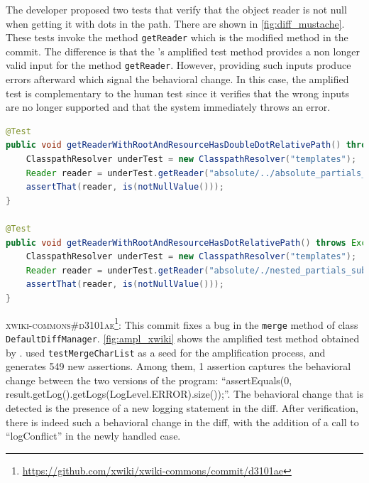 The developer proposed two tests that verify that the object reader is not null when getting it with dots in the path.
There are shown in \autoref{fig:diff_mustache}.
These tests invoke the method \texttt{getReader} which is the modified method in the commit.
%
The difference is that the \DCII's amplified test method provides a non longer valid input for the method \texttt{getReader}.
However, providing such inputs produce errors afterward which signal the behavioral change.
In this case, the amplified test is complementary to the human test since it verifies that the wrong inputs are no longer supported and that the system immediately throws an error.

\begin{lstlisting}[language=java,caption=Developer test for \textsc{774ae7a} of Mustache.java.,label=fig:diff_mustache]
@Test
public void getReaderWithRootAndResourceHasDoubleDotRelativePath() throws Exception {
	ClasspathResolver underTest = new ClasspathResolver("templates");
	Reader reader = underTest.getReader("absolute/../absolute_partials_template.html");
	assertThat(reader, is(notNullValue()));
}

@Test
public void getReaderWithRootAndResourceHasDotRelativePath() throws Exception {
	ClasspathResolver underTest = new ClasspathResolver("templates");
	Reader reader = underTest.getReader("absolute/./nested_partials_sub.html");
	assertThat(reader, is(notNullValue()));
}
\end{lstlisting}

\textsc{xwiki-commons\#d3101ae}\footnote{\url{https://github.com/xwiki/xwiki-commons/commit/d3101ae}}: This commit fixes a bug in the \texttt{merge} method of class \texttt{DefaultDiffManager}.
\autoref{fig:ampl_xwiki} shows the amplified test method obtained by \DCIA.
\DCI used \texttt{testMergeCharList} as a seed for the amplification process, and generates 549 new assertions.
Among them, 1 assertion captures the behavioral change between the two versions of the program: 
``assertEquals(0, result.getLog().getLogs(LogLevel.ERROR).size());''.
The behavioral change that is detected is the presence of a new logging statement in the diff. 
After verification, there is indeed such a behavioral change in the diff, with the addition of a call to ``logConflict'' in the newly handled case.

